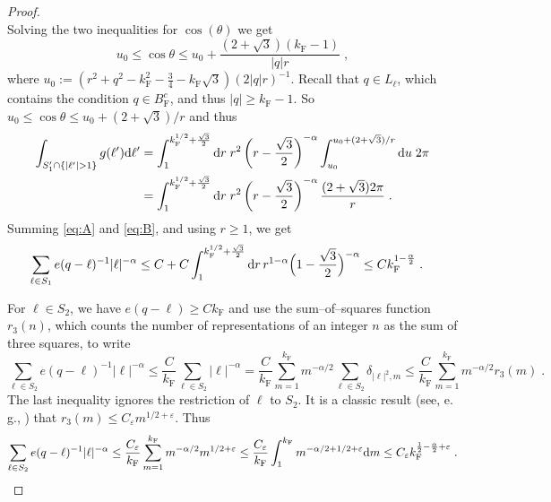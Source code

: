 \documentclass[12pt,a4paper]{article}
\numberwithin{equation}{section}
\newcommand{\1}{\mathbb{I}}
\newcommand{\di}{\textnormal{d}}
\newcommand{\F}{\mathrm{F}}
\newcommand{\kF}{k_\F}
\newcommand{\BFc}{B_\F^c}
\theoremstyle{plain}
\theoremstyle{definition}
\theoremstyle{remark}
\theoremstyle{plain}
\theoremstyle{definition}
\theoremstyle{remark}
\begin{document}
\begin{proof}
\[\]
Solving the two inequalities for $\cos(\theta)$ we get
\[
   u_0 \leq \cos \theta \leq u_0 + \frac{(2 + \sqrt{3})(\kF - 1)}{\lvert q\rvert r} \;,
\]
where $u_0 := (r^2 + q^2 - \kF^2 - \tfrac{3}{4} - \kF \sqrt{3})(2 \lvert q\rvert  r)^{-1}$. Recall that $q \in L_\ell$, which contains the condition $q \in \BFc$, and thus $\lvert q \rvert \geq \kF - 1$. So $u_0 \leq \cos \theta \leq u_0 + (2 + \sqrt{3})/r$ and thus
\begin{align} \label{eq:B}
\begin{split}
\int_{S_1' \cap \{\lvert
	\ell' \rvert > 1\}} g(\ell') \di \ell'
	& = \int_1^{\kF^{1/2} + \frac{\sqrt{3}}{2}} \di r\; r^2 \left( r - \frac{\sqrt{3}}{2} \right)^{-\alpha} \int_{u_0}^{u_0 + (2+\sqrt{3})/r} \di u \;  2\pi \\
	& = \int_1^{\kF^{1/2} + \frac{\sqrt{3}}{2}} \di r\; r^2 \left( r - \frac{\sqrt{3}}{2} \right)^{-\alpha} \frac{(2 + \sqrt{3})2\pi}{r} \;.
\end{split}
\end{align}
Summing \eqref{eq:A} and \eqref{eq:B}, and using $r \geq 1$, we get
\begin{align*}
	 \sum_{\ell \in S_1} e(q-\ell)^{-1} |\ell|^{-\alpha}
	&
\leq C + C \int_1^{\kF^{1/2} + \frac{\sqrt{3}}{2}} \di r \, r^{1-\alpha}  \Big( 1 - \frac{\sqrt{3}}{2} \Big)^{-\alpha}
	\le C \kF^{1 - \frac{\alpha}{2}} \;.
\end{align*}

For $ \ell \in S_2 $, we have $ e(q-\ell) \ge C \kF $ and use the sum--of--squares function $r_3(n)$, which counts the number of representations of an integer $n$ as the sum of three squares, to write
\begin{equation}
	\sum_{\ell \in S_2} e(q-\ell)^{-1} |\ell|^{-\alpha} \leq \frac{C}{\kF} \sum_{\ell \in S_2}  |\ell|^{-\alpha}
	= \frac{C}{\kF} \sum_{m = 1}^{\kF}  m^{-\alpha/2} \sum_{\ell \in S_2} \delta_{|\ell|^2, m}
	\leq \frac{C}{\kF} \sum_{m = 1}^{\kF}  m^{-\alpha/2} r_3(m) \;.
\end{equation}
The last inequality ignores the restriction of $\ell$ to $S_2$. It is a classic result (see, e.\,g., \cite{BRS17}) that $r_3(m) \leq C_\varepsilon m^{1/2 + \varepsilon}$. Thus
\begin{equation}
	\sum_{\ell \in S_2} e(q-\ell)^{-1} |\ell|^{-\alpha}
	\leq \frac{C_\varepsilon}{\kF} \sum_{m = 1}^{\kF}  m^{-\alpha/2}  m^{1/2 + \varepsilon}
	\leq \frac{C_\varepsilon}{\kF} \int_1^{\kF} m^{-\alpha/2 + 1/2 + \varepsilon} \di m
	\leq C_\varepsilon \kF^{\frac{1}{2} - \frac{\alpha}{2} + \varepsilon} \;.
\end{equation}


\end{proof}
\end{document}
